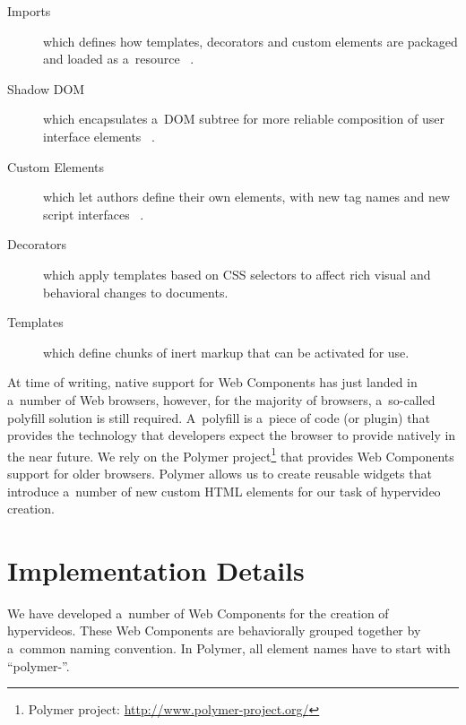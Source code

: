 \documentclass[runningheads,a4paper]{llncs}
\begin{document}
\begin{description}
  \item[Imports] which defines how templates, decorators and custom elements are packaged and loaded as a~resource%
  ~\cite{glazkov2014htmlimports}.
  \item[Shadow DOM] which encapsulates a~DOM subtree for more reliable composition of user interface elements%
  ~\cite{glazkov2014shadowdom}.    
  \item[Custom Elements] which let authors define their own elements, with new tag names and new script interfaces%
  ~\cite{glazkov2013customelements}.  
  \item[Decorators] which apply templates based on CSS selectors to affect rich visual and behavioral changes to documents.
  \item[Templates] which define chunks of inert markup that can be activated for use.  
\end{description}

\noindent At time of writing, native support for Web Components
has just landed in a~number of Web browsers,
however, for the majority of browsers,
a~so-called polyfill solution is still required.
A~polyfill  is a~piece of code (or plugin) that provides the technology
that developers expect the browser to provide natively in the near future.
We rely on the Polymer project\footnote{Polymer project:
\url{http://www.polymer-project.org/}}
that provides Web Components support for older browsers.
Polymer allows us to create reusable widgets that introduce a~number of new
custom HTML elements for our task of hypervideo creation.

\section{Implementation Details}

We have developed a~number of Web Components for the creation of hypervideos.
These Web Components are behaviorally grouped together
by a~common naming convention.
In Polymer, all element names have to start with ``polymer-''.
\end{document}

